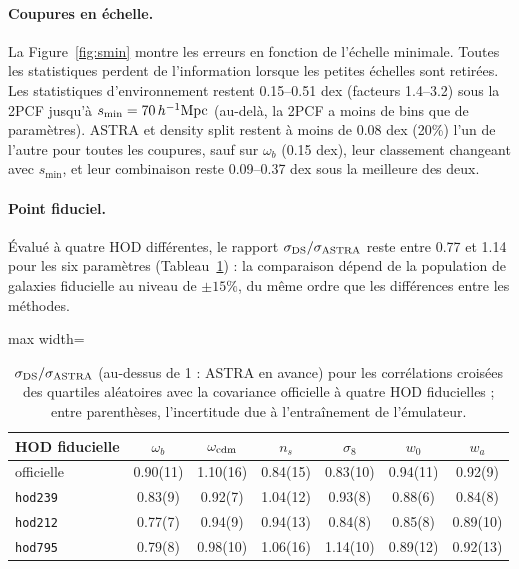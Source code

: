 \paragraph{Coupures en échelle.} La Figure~\ref{fig:smin} montre les erreurs en fonction de l'échelle minimale. Toutes les statistiques perdent de l'information lorsque les petites échelles sont retirées. Les statistiques d'environnement restent 0.15--0.51 dex (facteurs 1.4--3.2) sous la 2PCF jusqu'à $s_{\min}=70\,h^{-1}\mathrm{Mpc}$ (au-delà, la 2PCF a moins de bins que de paramètres). ASTRA et density split restent à moins de 0.08 dex (20\%) l'un de l'autre pour toutes les coupures, sauf sur $\omega_b$ (0.15 dex), leur classement changeant avec $s_{\min}$, et leur combinaison reste 0.09--0.37 dex sous la meilleure des deux.

\paragraph{Point fiduciel.} Évalué à quatre HOD différentes, le rapport $\sigma_{\rm DS}/\sigma_{\rm ASTRA}$ reste entre 0.77 et 1.14 pour les six paramètres (Tableau~\ref{tab:covbox}) : la comparaison dépend de la population de galaxies fiducielle au niveau de $\pm15\%$, du même ordre que les différences entre les méthodes.

\begin{table}[!htbp]
\centering\small
\begin{adjustbox}{max width=\linewidth}
\begin{tabular}{lcccccc}
\toprule
HOD fiducielle & $\omega_b$ & $\omega_{\rm cdm}$ & $n_s$ & $\sigma_8$ & $w_0$ & $w_a$ \\
\midrule
officielle & 0.90(11) & 1.10(16) & 0.84(15) & 0.83(10) & 0.94(11) & 0.92(9) \\
\texttt{hod239} & 0.83(9) & 0.92(7) & 1.04(12) & 0.93(8) & 0.88(6) & 0.84(8) \\
\texttt{hod212} & 0.77(7) & 0.94(9) & 0.94(13) & 0.84(8) & 0.85(8) & 0.89(10) \\
\texttt{hod795} & 0.79(8) & 0.98(10) & 1.06(16) & 1.14(10) & 0.89(12) & 0.92(13) \\
\bottomrule
\end{tabular}
\end{adjustbox}
\caption{$\sigma_{\rm DS}/\sigma_{\rm ASTRA}$ (au-dessus de 1 : ASTRA en avance) pour les corrélations croisées des quartiles aléatoires avec la covariance officielle à quatre HOD fiducielles ; entre parenthèses, l'incertitude due à l'entraînement de l'émulateur.}
\label{tab:covbox}
\end{table}


